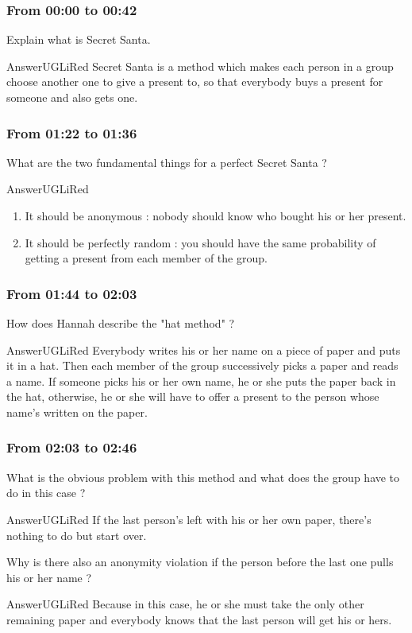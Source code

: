 \documentclass[12pt,a4paper,article,english,firamath]{nsi}
\begin{document}
\maketitle

\subsubsection*{From 00:00 to 00:42}
Explain what is Secret Santa.
\begin{encadrecolore}{Answer}{UGLiRed}
    Secret Santa is a method which makes each person in a group choose another one to give a present to, so that everybody buys a present for someone and also gets one.
\end{encadrecolore}
\subsubsection*{From 01:22 to 01:36}
What are the two fundamental things for a perfect Secret Santa ?
\begin{encadrecolore}{Answer}{UGLiRed}
    \begin{enumerate}
        \item It should be anonymous : nobody should know who bought his or her present.
        \item It should be perfectly random : you should have the same probability of getting a present from each member of the group.
    \end{enumerate}
\end{encadrecolore}
\subsubsection*{From 01:44 to 02:03}
How does Hannah describe the "hat method" ?
\begin{encadrecolore}{Answer}{UGLiRed}
    Everybody writes his or her name on a piece of paper and puts it in a hat.
    Then each member of the group successively picks a paper and reads a name. If someone picks his or her own name, he or she puts the paper back in the hat, otherwise, he or she will have to offer a present to the person whose name's written on the paper.
\end{encadrecolore}
\subsubsection*{From 02:03 to 02:46}
What is the obvious problem with this method and what does the group have to do in this case ?
\begin{encadrecolore}{Answer}{UGLiRed}
    If the last person's left with his or her own paper, there's nothing to do but start over.
\end{encadrecolore}
Why is there also an anonymity violation if the person before the last one pulls his or her name ?
\begin{encadrecolore}{Answer}{UGLiRed}
    Because in this case, he or she must take the only other remaining paper and everybody knows that the last person will get his or hers.
\end{encadrecolore}
\end{document}
